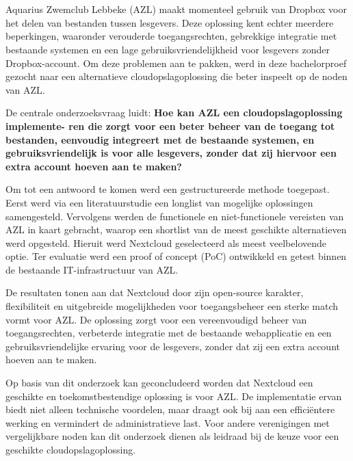 

\chapter*{}

Aquarius Zwemclub Lebbeke (AZL) maakt momenteel gebruik van Dropbox voor het delen van bestanden tussen lesgevers. Deze oplossing kent echter meerdere beperkingen, 
waaronder verouderde toegangsrechten, gebrekkige integratie met bestaande systemen en een lage gebruiksvriendelijkheid voor lesgevers zonder Dropbox-account. 
Om deze problemen aan te pakken, werd in deze bachelorproef gezocht naar een alternatieve cloudopslagoplossing die beter inspeelt op de noden van AZL.

De centrale onderzoeksvraag luidt: \textbf{Hoe kan AZL een cloudopslagoplossing implemente- ren die zorgt voor een beter beheer van de toegang tot bestanden, eenvoudig integreert met de bestaande systemen, en gebruiksvriendelijk is voor alle lesgevers, zonder dat zij hiervoor een extra account hoeven aan te maken?}

Om tot een antwoord te komen werd een gestructureerde methode toegepast. Eerst werd via een literatuurstudie een longlist van mogelijke oplossingen samengesteld. 
Vervolgens werden de functionele en niet-functionele vereisten van AZL in kaart gebracht, waarop een shortlist van de meest geschikte alternatieven werd opgesteld. 
Hieruit werd Nextcloud geselecteerd als meest veelbelovende optie. Ter evaluatie werd een proof of concept (PoC) ontwikkeld en getest binnen de 
bestaande IT-infrastructuur van AZL.

De resultaten tonen aan dat Nextcloud door zijn open-source karakter, flexibiliteit en uitgebreide mogelijkheden voor toegangsbeheer een sterke match vormt voor AZL. 
De oplossing zorgt voor een vereenvoudigd beheer van toegangsrechten, verbeterde integratie met de bestaande webapplicatie en een gebruiksvriendelijke ervaring voor 
de lesgevers, zonder dat zij een extra account hoeven aan te maken.

Op basis van dit onderzoek kan geconcludeerd worden dat Nextcloud een geschikte en toekomstbestendige oplossing is voor AZL. De implementatie ervan biedt niet 
alleen technische voordelen, maar draagt ook bij aan een efficiëntere werking en vermindert de administratieve last. Voor andere verenigingen met vergelijkbare 
noden kan dit onderzoek dienen als leidraad bij de keuze voor een geschikte cloudopslagoplossing.